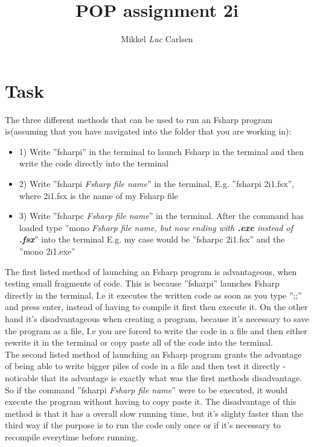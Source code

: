 \documentclass[a4paper]{article}
\title{POP assignment 2i}
\author{Mikkel \emph{Luc} Carlsen}
\begin{document}
    \maketitle 

    \section*{Task }

    The three different methods that can be used to run an Fsharp program is(assuming that you have navigated into the folder 
    that you are working in):

    \begin{itemize}
        \item 1) Write ''fsharpi'' in the terminal to launch Fsharp in the terminal and then write the code directly into the terminal
        \item 2) Write ''fsharpi \emph{Fsharp file name}'' in the terminal, E.g. ''fsharpi 2i1.fsx'', where 2i1.fsx is the name of my 
        Fsharp file
        \item 3) Write ''fsharpc \emph{Fsharp file name}'' in the terminal. After the command has loaded type ''mono 
        \emph{Fsharp file name, but now ending with \textbf{.exe} instead of \textbf{.fsx}}'' into the terminal E.g. 
        my case would be ''fsharpc 2i1.fsx'' and the ''mono 2i1.exe''
    \end{itemize}

    The first listed method of launching an Fsharp program is advantageous, when testing small fragments of code. 
    This is because ''fsharpi'' launches Fsharp directly in the terminal, I.e it executes the written code as soon as you type '';;'' 
    and press enter, instead of having to compile it first then execute it. On the other hand it's disadvantageous when creating
    a program, because it's necessary to save the program as a file, I.e you are forced to write the code in a file and then 
    either rewrite it in the terminal or copy paste all of the code into the terminal.\\

    The second listed method of launching an Fsharp program grants the advantage of being able to write bigger piles of code 
    in a file and then test it directly - noticable that its advantage is exactly what was the first methods disadvantage. 
    So if the command ''fsharpi \emph{Fsharp file name}'' were to be executed, it would execute the program without having to 
    copy paste it. The disadvantage of this method is that it has a overall slow running time, but it's slighty faster than the
    third way if the purpose is to run the code only once or if it's necessary to recompile everytime before running.\\
\end{document}
